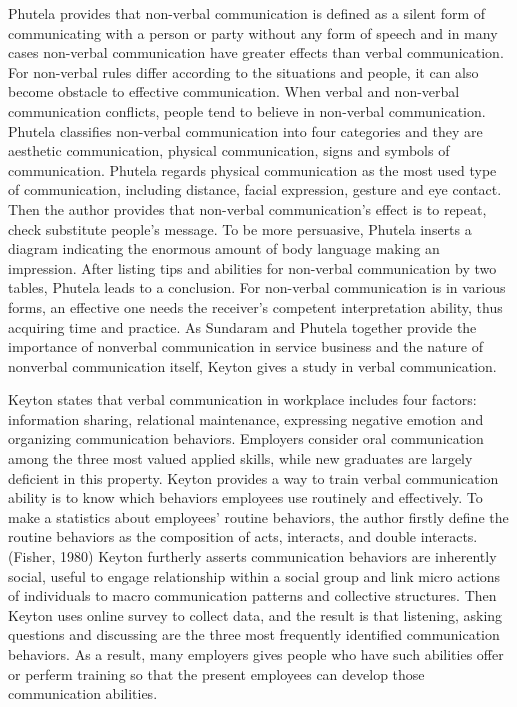 \documentclass[12pt]{article}
\begin{document}
\begin{flushleft}
Phutela provides that non-verbal communication is defined as a silent form of
communicating with a person or party without any form of speech and in many
cases non-verbal communication have greater effects than verbal communication.
For non-verbal rules differ according to the situations and people, it
can also become obstacle to effective communication.
When verbal and non-verbal communication conflicts, people tend to believe in
non-verbal communication.
Phutela classifies non-verbal communication into four categories and they are
aesthetic communication, physical communication, signs and symbols of
communication.
Phutela regards physical communication as the most used type of communication,
including distance, facial expression, gesture and eye contact.
Then the author provides that non-verbal communication’s effect is to repeat,
check substitute people’s message.
To be more persuasive, Phutela inserts a diagram indicating the enormous amount
of body language making an impression.
After listing tips and abilities for non-verbal communication by two tables,
Phutela leads to a conclusion.
For non-verbal communication is in various forms, an effective one needs the
receiver’s competent interpretation ability, thus acquiring time and practice.
As Sundaram and Phutela together provide the importance of nonverbal 
communication in service business and the nature of nonverbal communication
itself, Keyton gives a study in verbal communication.

Keyton states that verbal communication in workplace includes four factors:
information sharing, relational maintenance, expressing negative emotion and
organizing communication behaviors. Employers consider oral communication among
the three most valued applied skills, while new graduates are largely deficient
in this property. Keyton provides a way to train verbal communication ability is
to know which behaviors employees use routinely and effectively. To make a
statistics about employees' routine behaviors, the author firstly define the
routine behaviors as the composition of acts, interacts, and double
interacts.(Fisher, 1980) Keyton furtherly asserts communication behaviors are
inherently social, useful to engage relationship within a social group and link
micro actions of individuals to macro communication patterns and collective structures.
Then Keyton uses online survey to collect data, and the result is that
listening, asking questions and discussing are the three most frequently
identified communication behaviors. As a result, many employers gives people who
have such abilities offer or perferm training so that the present employees can
develop those communication abilities.





\end{flushleft}
\end{document}
